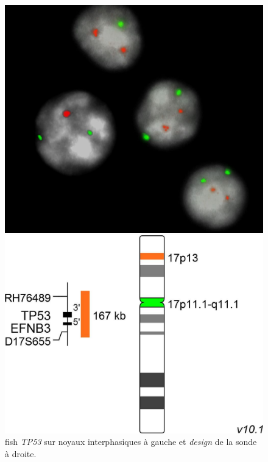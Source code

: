 \begin{figure}[H]
    \begin{minipage}{0.45\textwidth}
        \centering
        \includegraphics[width=1\textwidth]{images/fish_image.png}
    \end{minipage}
    \hfill
    \begin{minipage}{0.45\textwidth}
        \centering
        \includegraphics[width=01\textwidth]{images/fish.png}
    \end{minipage}
    \caption{
        \gls{fish} \textit{TP53} sur noyaux interphasiques à gauche et \textit{design} de la sonde à droite.
    }
    \label{fig:fish}
\end{figure}

